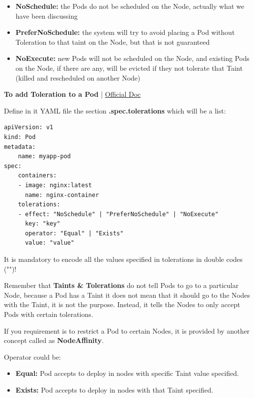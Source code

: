 \documentclass{article}
\newenvironment{blocktemplateII}[1]{%
    \tcolorbox[beamer,%
    noparskip,breakable,
    colframe=Green,%
    colbacklower=LimeGreen!75!LightGreen,%
    title=#1]}%
    {\endtcolorbox}
\newenvironment{blocktemplateIII}[1]{%
    \tcolorbox[beamer,%
    noparskip,breakable,
    ,colframe=Red,%
    colbacklower=LimeGreen!75!LightGreen,%
    title=#1]}%
    {\endtcolorbox}
\newenvironment{codetemplate}[1][]{%
  \mybasecolorbox[#1]
  \itshape
}{%
  \endmybasecolorbox
}
\begin{document}
\begin{itemize}
    \item \textbf{NoSchedule:} the Pods do not be scheduled on the Node, actually what we have been discussing
    \item \textbf{PreferNoSchedule:} the system will try to avoid placing a Pod without Toleration to that taint on the Node, but that is not guaranteed
    \item \textbf{NoExecute:} new Pods will not be scheduled on the Node, and existing Pods on the Node, if there are any, will be evicted if they not tolerate that Taint (killed and rescheduled on another Node)
\end{itemize}

\textbf{To add Toleration to a Pod} | \href{https://kubernetes.io/docs/concepts/scheduling-eviction/taint-and-toleration/}{Official Doc}

Define in it YAML file the section \textbf{.spec.tolerations} which will be a list:

\label{NodeSelector}
\begin{codetemplate}{}
\begin{verbatim}
apiVersion: v1
kind: Pod
metadata:
    name: myapp-pod
spec:
    containers:
    - image: nginx:latest
      name: nginx-container
    tolerations:
    - effect: "NoSchedule" | "PreferNoSchedule" | "NoExecute"
      key: "key" 
      operator: "Equal" | "Exists"
      value: "value"
\end{verbatim}
\end{codetemplate}

\begin{blocktemplateIII}{WARNING}
It is mandatory to encode all the values specified in tolerations in double codes ("")!
\end{blocktemplateIII}

\begin{blocktemplateII}{NOTE 1}
Remember that \textbf{Taints \& Tolerations} do not tell Pods to go to a particular Node, because a Pod has a Taint it does not mean that it should go to the Nodes with the Taint, it is not the purpose. Instead, it tells the Nodes to only accept Pods with certain tolerations.

If you requirement is to restrict a Pod to certain Nodes, it is provided by another concept called as \textbf{NodeAffinity}.
\end{blocktemplateII}

Operator could be:
\begin{itemize}
    \item \textbf{Equal:} Pod accepts to deploy in nodes with specific Taint value specified.
    \item \textbf{Exists:} Pod accepts to deploy in nodes with that Taint specified.
\end{itemize}
\end{document}
